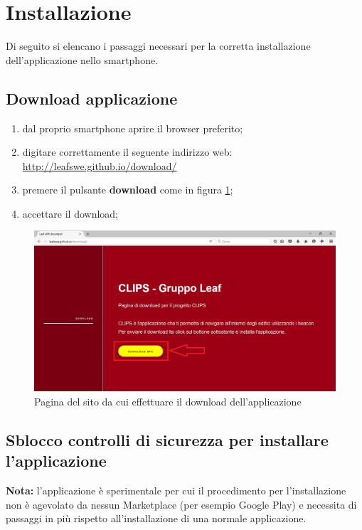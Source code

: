 \documentclass[../ClipsManualeUtente.tex]{subfiles}
\begin{document}
\section{Installazione}
	Di seguito si elencano i passaggi necessari per la corretta installazione dell'applicazione nello smartphone.
	

		\subsection{Download applicazione}
			\begin{enumerate}
				\item dal proprio smartphone aprire il browser preferito;
				\item digitare correttamente il seguente indirizzo web: \\
					\url{http://leafswe.github.io/download/}
				\item premere il pulsante \textbf{download} come in figura \ref{fig:DownloadApplicazioneSito};
				\item accettare il download;
			\end{enumerate}
			
			\begin{figure} [h]
				\centering
				\includegraphics[width=\textwidth]{img/DownloadApplicazioneSito}
				\caption{Pagina del sito da cui effettuare il download dell'applicazione}
				\label{fig:DownloadApplicazioneSito}
			\end{figure}
		
		\newpage
		\subsection{Sblocco controlli di sicurezza per installare l'applicazione}
		
			\begin{framed}
				\textbf{Nota:} l'applicazione è sperimentale per cui il procedimento per l'installazione non è agevolato da nessun \gls{Marketplace} (per esempio \gls{Google} Play) e necessita di passaggi in più rispetto all'installazione di una normale applicazione.
			\end{framed}
		
\end{document}
